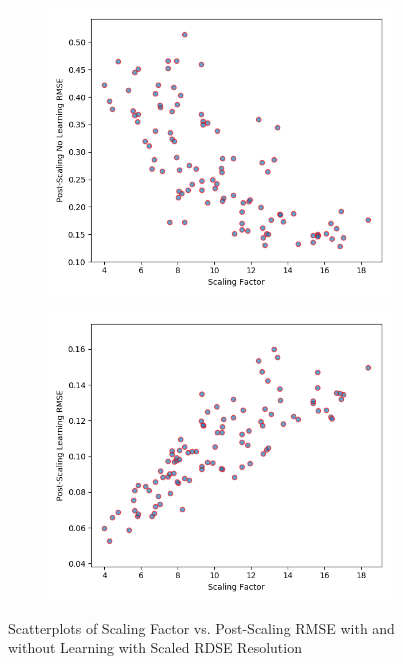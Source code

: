\documentclass[oneside,12pt,openany]{book}
\begin{document}
    \begin{figure}[hbt!]
        \centering
        \begin{subfigure}[b]{.48\textwidth}
            \includegraphics[width=\linewidth]{images/ScalingFactorbyPost-ScalingNoLearningRMSE-Changed.png}
        \end{subfigure}
        \begin{subfigure}[b]{.48\textwidth}
            \includegraphics[width=\linewidth]{images/ScalingFactorbyPost-ScalingLearningRMSE-Changed.png}
        \end{subfigure}
        \caption{Scatterplots of Scaling Factor vs. Post-Scaling RMSE with and without Learning with Scaled RDSE Resolution}
        \label{fig:genscatter:changed}
    \end{figure}
    
\end{document}

